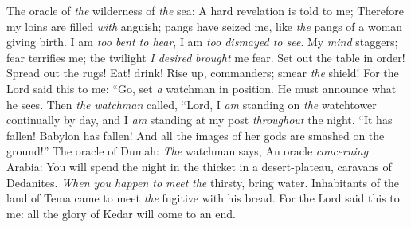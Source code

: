 \begin{biblechapter} %
 The oracle of \textit{the} wilderness of \textit{the} sea:
\verse A hard revelation is told to me;
\verse Therefore my loins are filled \textit{with} anguish; 
pangs have seized me, like \textit{the} pangs of a woman giving birth. 
I am \textit{too bent to hear}, 
I am \textit{too dismayed to see}.
\verse My \textit{mind} staggers; fear terrifies me; 
the twilight \textit{I desired} \textit{brought} me fear.
\verse Set out the table in order! 
Spread out the rugs! 
Eat! drink! 
Rise up, commanders; 
smear \textit{the} shield!
\verse For the Lord said this to me:
\verse “Go, set \textit{a} watchman in position. 
He must announce what he sees.
\verse Then \textit{the} \textit{watchman} called,
\verse “Lord, I \textit{am} standing on \textit{the} watchtower continually by day, 
and I \textit{am} standing at my post \textit{throughout} the night.
\verse “It has fallen! Babylon has fallen! 
And all the images of her gods are smashed on the ground!”
 The oracle of Dumah:
\verse \textit{The} watchman says,
 An oracle \textit{concerning} Arabia:
\verse You will spend the night in the thicket in a desert-plateau, 
caravans of Dedanites.
\verse \textit{When you happen to meet} \textit{the} thirsty, bring water. 
Inhabitants of the land of Tema came to meet \textit{the} fugitive with his bread.
\verse For the Lord said this to me:
\verse all the glory of Kedar will come to an end.
\end{biblechapter}

